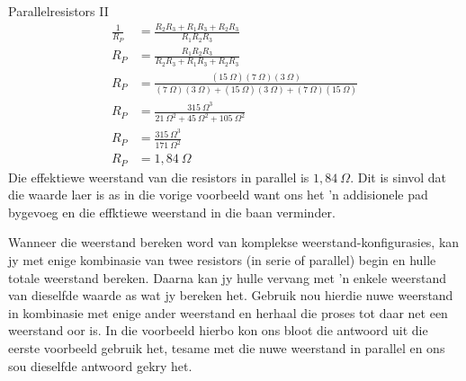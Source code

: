 \begin{wex}{Parallelresistors II}
{\begin{align*}
\frac{1}{R_P}&=\frac{R_2R_3+R_1R_3+R_2R_3}{R_1R_2R_3}\\ 
R_P&=\frac{R_1R_2R_3}{R_2R_3+R_1R_3+R_2R_3}\\ 
R_P&=\frac{(15~\Omega)(7~\Omega)(3~\Omega)}{
(7~\Omega)(3~\Omega)+(15~\Omega)(3~\Omega)+(7~\Omega)(15~\Omega)}\\ 
R_P&=\frac{315~\Omega^3}{21~\Omega^2+45~\Omega^2+105~\Omega^2}\\ 
R_P&=\frac{315~\Omega^3}{171~\Omega^2}\\ 
R_P&=1,84~\Omega
\end{align*}
Die effektiewe weerstand van die resistors in parallel is $1,84~\Omega$. Dit is
sinvol dat die waarde laer is as in die vorige voorbeeld want ons het 'n
addisionele pad bygevoeg en die effktiewe weerstand in die baan
verminder.}\end{wex}

Wanneer die weerstand bereken word van komplekse weerstand-konfigurasies, kan
jy met enige kombinasie van twee resistors (in serie of parallel) begin en
hulle totale weerstand bereken. Daarna kan jy hulle vervang met 'n enkele
weerstand van dieselfde waarde as wat jy bereken het. Gebruik nou hierdie nuwe
weerstand in kombinasie met enige ander weerstand en herhaal die proses tot
daar net een weerstand oor is. In die voorbeeld hierbo kon ons bloot die
antwoord uit die eerste voorbeeld gebruik het, tesame met die nuwe weerstand in
parallel en ons sou dieselfde antwoord gekry het.

